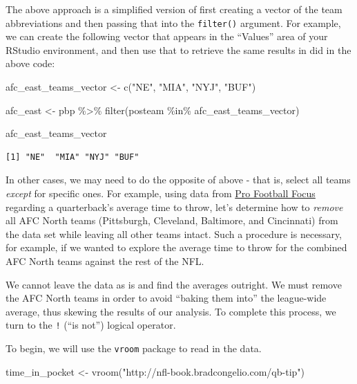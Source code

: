 \documentclass[
  letterpaper,
]{krantz}
\newenvironment{Shaded}{\begin{snugshade}}{\end{snugshade}}
\newcommand{\FunctionTok}[1]{\textcolor[rgb]{0.28,0.35,0.67}{#1}}
\newcommand{\NormalTok}[1]{\textcolor[rgb]{0.00,0.23,0.31}{#1}}
\newcommand{\OtherTok}[1]{\textcolor[rgb]{0.00,0.23,0.31}{#1}}
\newcommand{\SpecialCharTok}[1]{\textcolor[rgb]{0.37,0.37,0.37}{#1}}
\newcommand{\StringTok}[1]{\textcolor[rgb]{0.13,0.47,0.30}{#1}}
\begin{document}
The above approach is a simplified version of first creating a vector of
the team abbreviations and then passing that into the \texttt{filter()}
argument. For example, we can create the following vector that appears
in the ``Values'' area of your RStudio environment, and then use that to
retrieve the same results in did in the above code:

\begin{Shaded}
\begin{Highlighting}[]
\NormalTok{afc\_east\_teams\_vector }\OtherTok{\textless{}{-}} \FunctionTok{c}\NormalTok{(}\StringTok{"NE"}\NormalTok{, }\StringTok{"MIA"}\NormalTok{, }\StringTok{"NYJ"}\NormalTok{, }\StringTok{"BUF"}\NormalTok{)}

\NormalTok{afc\_east }\OtherTok{\textless{}{-}}\NormalTok{ pbp }\SpecialCharTok{\%\textgreater{}\%}
  \FunctionTok{filter}\NormalTok{(posteam }\SpecialCharTok{\%in\%}\NormalTok{ afc\_east\_teams\_vector)}

\NormalTok{afc\_east\_teams\_vector}
\end{Highlighting}
\end{Shaded}

\begin{verbatim}
[1] "NE"  "MIA" "NYJ" "BUF"
\end{verbatim}

In other cases, we may need to do the opposite of above - that is,
select all teams \emph{except} for specific ones. For example, using
data from \href{pff.com}{Pro Football Focus} regarding a quarterback's
average time to throw, let's determine how to \emph{remove} all AFC
North teams (Pittsburgh, Cleveland, Baltimore, and Cincinnati) from the
data set while leaving all other teams intact. Such a procedure is
necessary, for example, if we wanted to explore the average time to
throw for the combined AFC North teams against the rest of the NFL.

We cannot leave the data as is and find the averages outright. We must
remove the AFC North teams in order to avoid ``baking them into'' the
league-wide average, thus skewing the results of our analysis. To
complete this process, we turn to the \texttt{!} (``is not'') logical
operator.

To begin, we will use the \texttt{vroom} package to read in the data.

\begin{Shaded}
\begin{Highlighting}[]
\NormalTok{time\_in\_pocket }\OtherTok{\textless{}{-}} \FunctionTok{vroom}\NormalTok{(}\StringTok{"http://nfl{-}book.bradcongelio.com/qb{-}tip"}\NormalTok{)}
\end{Highlighting}
\end{Shaded}
\end{document}
